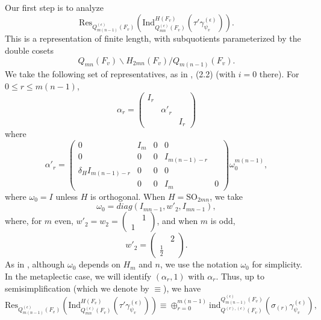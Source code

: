 \documentclass[12pts]{amsart}
\newcommand{\Ind}{{\mathrm{Ind}}}
\newcommand{\ind}{{\mathrm{ind}}}
\newcommand{\Res}{{\mathrm{Res}}}
\newcommand{\SO}{{\mathrm{SO}}}
\begin{document}
Our first step is to analyze
\begin{equation}\label{12.20}
 \Res_{Q^{(\epsilon)}_{m(n-1)}(F_v)}(\Ind^{H(F_v)}_{Q^{(\epsilon)}_{mn}(F_v)}(\tau'\gamma_{\psi_v}^{(\epsilon)})).
\end{equation}
This is a representation of finite length, with subquotients parameterized by the double
cosets
\begin{equation}\label{12.21}
Q_{mn}(F_v)\backslash H_{2mn}(F_v)/Q_{m(n-1)}(F_v).
\end{equation}
We take the following set of representatives, as in \cite{GS18}, (2.2) (with $i=0$ there). For
$0\leq r\leq m(n-1)$,
\begin{equation}\label{12.22}
\alpha_r=\begin{pmatrix}I_r\\&\alpha'_r\\&&I_r\end{pmatrix}
\end{equation}
where
$$
\alpha'_r=\begin{pmatrix}0 &I_m&0&0\\
0&0 &0&I_{m(n-1)-r} \\
\delta_HI_{m(n-1)-r}&0 &0&0 \\
&0 &0 &I_m&0\end{pmatrix}\omega_0^{m(n-1)},
$$
where $\omega_0=I$ unless $H$ is orthogonal. When $H=\SO_{2mn}$, we take
\begin{equation}\label{12.23}
\omega_0=diag (I_{mn-1},w'_2,I_{mn-1}),
\end{equation}
where, for $m$ even, $w'_2=w_2=\begin{pmatrix}&1\\1\end{pmatrix}$, and when $m$ is odd,
$$
w'_2=\begin{pmatrix}&2\\ \frac{1}{2}\end{pmatrix}.
$$
As in \cite{GS18}, although $\omega_0$ depends on $H_m$ and $n$, we use the notation $\omega_0$ for simplicity. In the metaplectic case, we will identify $(\alpha_r,1)$ with $\alpha_r$.
Thus, up to semisimplification (which we denote by $\equiv$), we have 
\begin{equation}\label{12.24}
 \Res_{Q^{(\epsilon)}_{m(n-1)}(F_v)}(\Ind^{H(F_v)}_{Q^{(\epsilon)}_{mn}(F_v)}(\tau'\gamma_{\psi_v}^{(\epsilon)}))\equiv \oplus_{r=0}^{m(n-1)}\ind^{Q^{(\epsilon)}_{m(n-1)}(F_v)}_{Q^{(r),(\epsilon)}(F_v)}(\sigma_{(r)}\gamma^{(\epsilon)}_{\psi_v}),
\end{equation}
\end{document}
